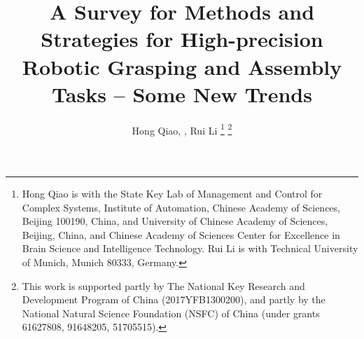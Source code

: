 \documentclass[journal,twoside,web]{ieeecolor}
\providecommand{\DIFaddbegin}{} %
\providecommand{\DIFaddend}{} %
\providecommand{\DIFdelbegin}{} %
\providecommand{\DIFdelend}{} %
\newcommand{\DIFscaledelfig}{0.5}
\newlength{\DIFdelgraphicswidth} %
\newlength{\DIFdelgraphicsheight} %
\newcommand{\DIFaddincludegraphics}[2][]{{\color{blue}\fbox{\DIFOincludegraphics[#1]{#2}}}} %
\newcommand{\DIFdelincludegraphics}[2][]{%
\sbox{\DIFdelgraphicsbox}{\DIFOincludegraphics[#1]{#2}}%
\settoboxwidth{\DIFdelgraphicswidth}{\DIFdelgraphicsbox} %
\settoboxtotalheight{\DIFdelgraphicsheight}{\DIFdelgraphicsbox} %
\scalebox{\DIFscaledelfig}{%
\parbox[b]{\DIFdelgraphicswidth}{\usebox{\DIFdelgraphicsbox}\\[-\baselineskip] \rule{\DIFdelgraphicswidth}{0em}}\llap{\resizebox{\DIFdelgraphicswidth}{\DIFdelgraphicsheight}{%
\setlength{\unitlength}{\DIFdelgraphicswidth}%
\begin{picture}(1,1)%
\thicklines\linethickness{2pt} %
{\color[rgb]{1,0,0}\put(0,0){\framebox(1,1){}}}%
{\color[rgb]{1,0,0}\put(0,0){\line( 1,1){1}}}%
{\color[rgb]{1,0,0}\put(0,1){\line(1,-1){1}}}%
\end{picture}%
}\hspace*{3pt}}} %
} %
\DeclareRobustCommand{\DIFaddbegin}{\DIFOaddbegin \let\includegraphics\DIFaddincludegraphics} %
\DeclareRobustCommand{\DIFaddend}{\DIFOaddend \let\includegraphics\DIFOincludegraphics} %
\DeclareRobustCommand{\DIFdelbegin}{\DIFOdelbegin \let\includegraphics\DIFdelincludegraphics} %
\DeclareRobustCommand{\DIFdelend}{\DIFOaddend \let\includegraphics\DIFOincludegraphics} %
\begin{document}
\title{A Survey for Methods and Strategies for High-precision Robotic Grasping and Assembly Tasks -- Some New Trends}
\author{Hong Qiao, , Rui Li
\DIFdelbegin %
\DIFdelend \DIFaddbegin \thanks{Hong Qiao is with the State Key Lab of Management and Control for Complex Systems, Institute of Automation, Chinese Academy of Sciences, Beijing 100190, China, and University of Chinese Academy of Sciences, Beijing, China, and Chinese Academy of Sciences Center for Excellence in Brain Science and Intelligence Technology. Rui Li is with Technical University of Munich, Munich 80333, Germany.}
\DIFaddend \thanks{This work is supported partly by The National Key Research and Development Program of China (2017YFB1300200), and partly by the National Natural Science Foundation (NSFC) of China (under grants 61627808, 91648205, 51705515).}}

\maketitle
\end{document}
